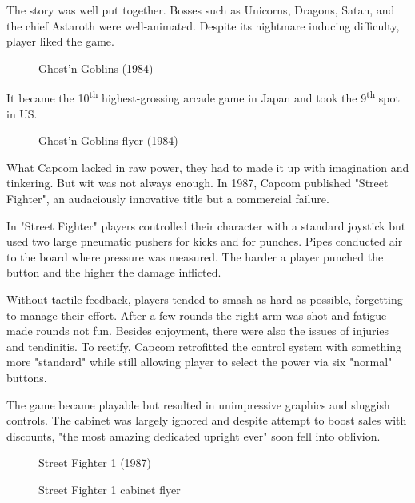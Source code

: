 The story was well put together. Bosses such as Unicorns, Dragons, Satan, and the chief Astaroth were well-animated. Despite its nightmare inducing difficulty, player liked the game. 

\vfill 

\begin{figure}[H]
\caption*{Ghost’n Goblins (1984)}
\end{figure}
\pagebreak

It became the 10\textsuperscript{th} highest-grossing arcade game in Japan and took the 9\textsuperscript{th} spot in US.
\vfill 
\begin{figure}[H]
\caption*{Ghost’n Goblins flyer (1984)}
\end{figure}
\pagebreak

What Capcom lacked in raw power, they had to made it up with imagination and tinkering. But wit was not always enough. In 1987, Capcom published "Street Fighter", an audaciously innovative title but a commercial failure.

In "Street Fighter" players controlled their character with a standard joystick but used two large pneumatic pushers for kicks and for punches. Pipes conducted air to the board where pressure was measured. The harder a player punched the button and the higher the damage inflicted.

Without tactile feedback, players tended to smash as hard as possible, forgetting to manage their effort. After a few rounds the right arm was shot and fatigue made rounds not fun. Besides enjoyment, there were also the issues of injuries and tendinitis. To rectify, Capcom retrofitted the control system with something more "standard" while still allowing player to select the power via six "normal" buttons. 

The game became playable but resulted in unimpressive graphics and sluggish controls. The cabinet was largely ignored and despite attempt to boost sales with discounts, "the most amazing dedicated upright ever" soon fell into oblivion.


\begin{figure}[H]
\caption*{Street Fighter 1 (1987)}
\end{figure}


\begin{figure}[H]
\caption*{Street Fighter 1 cabinet flyer}
\end{figure}


